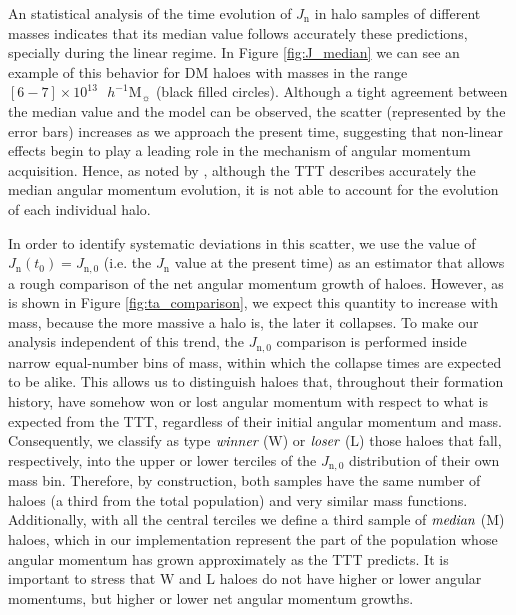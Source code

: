 \documentclass[fleqn,usenatbib]{mnras}
\newcommand{\hMsun}{{\textrm{ $h^{-1}$M$_{\sun}$}}}
\newcommand{\Wh}{\mathrm{W}}
\newcommand{\Lh}{\mathrm{L}}
\newcommand{\Mh}{\mathrm{M}}
\newcommand{\winner}{{\emph{winner}}}
\newcommand{\loser}{{\emph{loser}}}
\newcommand{\median}{{\emph{median}}}
\begin{document}
An statistical analysis of the time evolution of $J_\mathrm{n}$ in halo samples of different masses indicates that its median value follows accurately these predictions, specially during the linear regime. In Figure \ref{fig:J_median} we can see an example of this behavior for DM haloes with masses in the range $[6-7]\times 10^{13}\hMsun$ (black filled circles). Although a tight agreement between the median value and the model can be observed, the scatter (represented by the error bars) increases as we approach the present time, suggesting that non-linear effects begin to play a leading role in the mechanism of angular momentum acquisition. Hence, as noted by \citet{porcianietal2002a}, although the TTT describes accurately the median angular momentum evolution, it is not able to account for the evolution of each individual halo.

In order to identify systematic deviations in this scatter, we use the value of $J_\mathrm{n}(t_0)=J_\mathrm{n,0}$ (i.e. the $J_\mathrm{n}$ value at the present time) as an estimator that allows a rough comparison of the {net angular momentum growth} of haloes. However, as is shown in Figure \ref{fig:ta_comparison}, we expect this quantity to increase with mass, because the more massive a halo is, the later it collapses. To make our analysis independent of this trend, the $J_\mathrm{n,0}$ comparison is performed inside narrow equal-number bins of mass, within which the collapse times are expected to be alike. This allows us to distinguish haloes that, throughout their formation history, have somehow {won} or {lost} angular momentum with respect to what is expected from the TTT, regardless of their initial angular momentum and mass. Consequently, we classify as type $\winner$ ($\Wh$) or $\loser$ ($\Lh$) those haloes that fall, respectively, into the upper or lower terciles of the $J_\mathrm{n,0}$ distribution of their own mass bin. Therefore, by construction, both samples have the same number of haloes (a third from the total population) and very similar mass functions. Additionally, with all the central terciles we define a third sample of $\median$ ($\Mh$) haloes, which in our implementation represent the part of the population whose angular momentum has grown approximately as the TTT predicts. It is important to stress that $\Wh$ and $\Lh$ haloes do not have higher or lower angular momentums, but higher or lower net angular momentum growths. 
\end{document}
